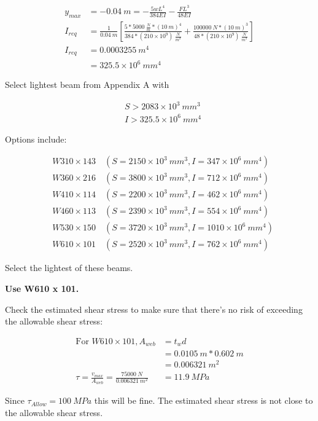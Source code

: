\documentclass[
  letterpaper,
  DIV=11,
  numbers=noendperiod]{scrreprt}
\theoremstyle{definition}
\theoremstyle{remark}
\begin{document}
\begin{tcolorbox}
\begin{tcolorbox}
\[
\begin{aligned}
y_{max}&= -0.04{~m}=-\frac{5wL^4}{384EI}-\frac{FL^3}{48EI} \\
I_{req}&=\frac{1}{0.04{~m}}\left[\frac{5*5000~\frac{N}{m}*(10{~m})^4}{384*(210 \times 10^9)~\frac{N}{m^2}}+\frac{100000{~N}*(10{~m})^3}{48*(210 \times 10^9)~\frac{N}{m^2}}\right] \\
I_{req}&=0.0003255{~m}^4 \\
&= 325.5 \times 10^6{~mm}^4
\end{aligned}
\]

Select lightest beam from Appendix A with

\[
\begin{aligned} 
& S>2083\times10^3{~mm}^3 \\ 
& I>325.5\times10^6 {~mm}^4
\end{aligned}
\]

Options include:

\[
\begin{aligned}&W310\times143\quad(S=2150\times10^3~mm^3,I=347\times10^6~mm^4)\\
&W360\times216\quad(S=3800\times10^3~mm^3,I=712\times10^6~mm^4)\\
&W410\times114\quad(S=2200\times10^3~mm^3,I=462\times10^6~mm^4)\\
&W460\times113\quad(S=2390\times10^3~mm^3,I=554\times10^6~mm^4)\\
&W530\times150\quad(S=3720\times10^3~mm^3,I=1010\times10^6~mm^4)\\
&W610\times101\quad(S=2520\times10^3~mm^3,I=762\times10^6~mm^4)\end{aligned}
\]

Select the lightest of these beams.

\textbf{Use W610 x 101.}

Check the estimated shear stress to make sure that there's no risk of
exceeding the allowable shear stress:

\[
\begin{aligned}
{\text{For }}W610\times 101, A_{web}&=t_w d \\
&=0.0105{~m}*0.602{~m} \\
&=0.006321{~m}^2 \\
\tau=\frac{v_{max}}{A_{web}}=\frac{75000{~N}}{0.006321{~m^2}}&=11.9{~MPa}
\end{aligned}
\]

Since \(\tau_{Allow}=100 ~MPa\) this will be fine. The estimated shear
stress is not close to the allowable shear stress.

\end{tcolorbox}

\end{tcolorbox}
\end{document}
